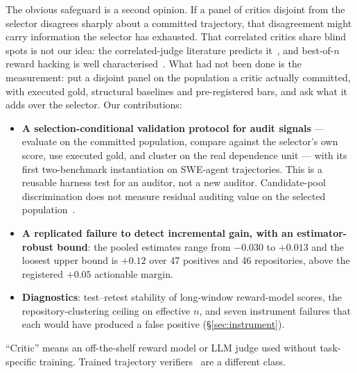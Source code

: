 \documentclass[10pt]{article}
\begin{document}
The obvious safeguard is a second opinion. If a panel of critics disjoint from the selector disagrees sharply about a committed trajectory, that disagreement might carry information the selector has exhausted. That correlated critics share blind spots is not our idea: the correlated-judge literature predicts it~\citep{goel2025great,kim2025correlated,kohli2026nine,hossain2026agreement,afrin2026ensembles}, and best-of-$n$ reward hacking is well characterised~\citep{gao2023scaling,khalaf2025inference,yu2026caution}. What had not been done is the measurement: put a disjoint panel on the population a critic actually committed, with executed gold, structural baselines and pre-registered bars, and ask what it adds over the selector. Our contributions:
\begin{itemize}[leftmargin=1.2em,itemsep=0pt]
\item \textbf{A selection-conditional validation protocol for audit signals} --- evaluate on the committed population, compare against the selector's own score, use executed gold, and cluster on the real dependence unit --- with its first two-benchmark instantiation on SWE-agent trajectories. This is a reusable harness test for an auditor, not a new auditor. Candidate-pool discrimination does not measure residual auditing value on the selected population~\citep{emadi2026scaling,trilemma2026}.
\item \textbf{A replicated failure to detect incremental gain, with an estimator-robust bound}: the pooled estimates range from $-0.030$ to $+0.013$ and the loosest upper bound is $+0.12$ over 47 positives and 46 repositories, above the registered $+0.05$ actionable margin.
\item \textbf{Diagnostics}: test--retest stability of long-window reward-model scores, the repository-clustering ceiling on effective $n$, and seven instrument failures that each would have produced a false positive (\S\ref{sec:instrument}).
\end{itemize}
``Critic'' means an off-the-shelf reward model or LLM judge used without task-specific training. Trained trajectory verifiers~\citep{shum2025swerm,rahman2026scout,wang2026failfast} are a different class.
\end{document}
